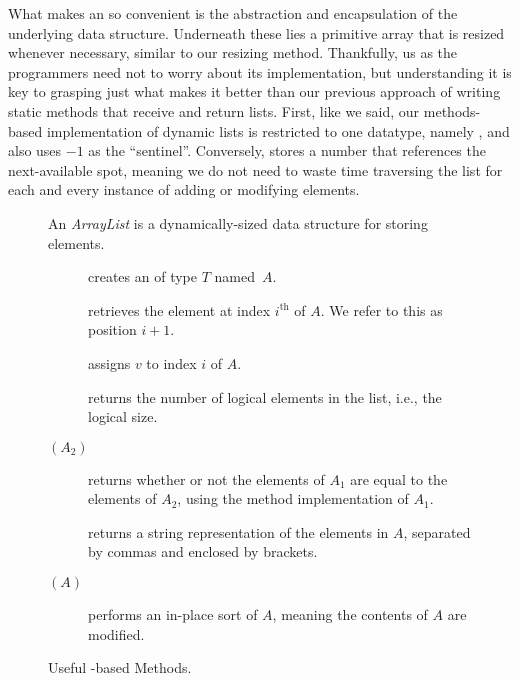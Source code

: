 What makes an  so convenient is the abstraction and encapsulation of the underlying data structure. Underneath these lies a primitive array that is resized whenever necessary, similar to our resizing method. Thankfully, us as the programmers need not to worry about its implementation, but understanding it is key to grasping just what makes it better than our previous approach of writing static methods that receive and return lists. First, like we said, our methods-based implementation of dynamic lists is restricted to one datatype, namely , and also uses $-1$ as the ``sentinel''. Conversely,  stores a number that references the next-available spot, meaning we do not need to waste time traversing the list for each and every instance of adding or modifying elements.

\begin{figure}[tp]
  \small
  \begin{tcolorbox}[title=Java Array Lists]
    An \textit{ArrayList} is a dynamically-sized data structure for storing elements.
    \vspace{2ex}
  \begin{description}
    \item [] creates an  of type $T$ named~$A$.
    \item [] retrieves the element at index $i^{\text{th}}$ of $A$. We refer to this as position $i + 1$. 
    \item [] assigns $v$ to index $i$ of $A$.
    \item [] returns the number of logical elements in the list, i.e., the logical size.
    \item [$(A_2)$] returns whether or not the elements of $A_1$ are equal to the elements of $A_2$, using the  method implementation of $A_1$.
    \item [] returns a string representation of the elements in $A$, separated by commas and enclosed by brackets.
    \item [$(A)$] performs an in-place sort of $A$, meaning the contents of $A$ are modified.
  \end{description}
\end{tcolorbox}
  \caption{Useful -based Methods.}
  \label{fig:arraylists}
\end{figure}

